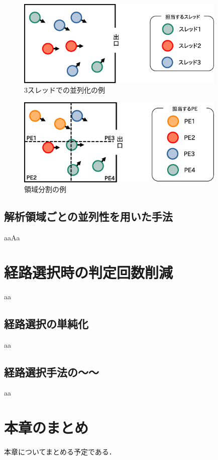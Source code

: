 \begin{figure}[hp]
 \begin{center}
  \includegraphics[width=10cm,clip]{figure/sureddo_heiretu.eps}
  \caption{3スレッドでの並列化の例}
  \label{fig:agent_heiretu}
 \end{center}
\end{figure}


\begin{figure}[hbtp]
 \begin{center}
  \includegraphics[width=10cm,clip]{figure/ryoiki_heiretu.eps}
  \caption{領域分割の例}
  \label{fig:atigenshou}
 \end{center}
\end{figure}


\clearpage

\subsection{解析領域ごとの並列性を用いた手法}
aaAa

\section{経路選択時の判定回数削減}
aa

\subsection{経路選択の単純化}
aa

\subsection{経路選択手法の～～}
aa

\section{本章のまとめ}
本章についてまとめる予定である．

